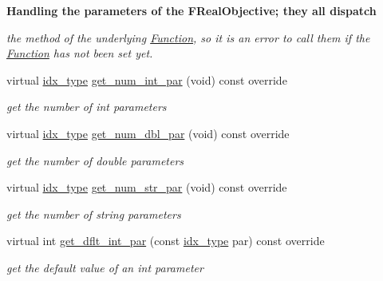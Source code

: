 \begin{Indent}\textbf{ Handling the parameters of the F\+Real\+Objective; they all dispatch}\par
{\em the method of the underlying \mbox{\hyperlink{class_s_m_spp__di__unipi__it_1_1_function}{Function}}, so it is an error to call them if the \mbox{\hyperlink{class_s_m_spp__di__unipi__it_1_1_function}{Function}} has not been set yet. }\begin{DoxyCompactItemize}
\item 
virtual \mbox{\hyperlink{class_s_m_spp__di__unipi__it_1_1_thin_compute_interface_aa3d710629ad8c434286726ad810c3b47}{idx\+\_\+type}} \mbox{\hyperlink{class_s_m_spp__di__unipi__it_1_1_f_real_objective_a3ad74d9506761eb2ca4c8a936fb7a1c5}{get\+\_\+num\+\_\+int\+\_\+par}} (void) const override
\begin{DoxyCompactList}\small\item\em get the number of int parameters \end{DoxyCompactList}\item 
virtual \mbox{\hyperlink{class_s_m_spp__di__unipi__it_1_1_thin_compute_interface_aa3d710629ad8c434286726ad810c3b47}{idx\+\_\+type}} \mbox{\hyperlink{class_s_m_spp__di__unipi__it_1_1_f_real_objective_a842fd454acaded84baf6b77e0d61a950}{get\+\_\+num\+\_\+dbl\+\_\+par}} (void) const override
\begin{DoxyCompactList}\small\item\em get the number of double parameters \end{DoxyCompactList}\item 
virtual \mbox{\hyperlink{class_s_m_spp__di__unipi__it_1_1_thin_compute_interface_aa3d710629ad8c434286726ad810c3b47}{idx\+\_\+type}} \mbox{\hyperlink{class_s_m_spp__di__unipi__it_1_1_f_real_objective_a91f0341f09d59b3023fc95122a625125}{get\+\_\+num\+\_\+str\+\_\+par}} (void) const override
\begin{DoxyCompactList}\small\item\em get the number of string parameters \end{DoxyCompactList}\item 
virtual int \mbox{\hyperlink{class_s_m_spp__di__unipi__it_1_1_f_real_objective_a75dd1491b74c4b9476755e061dce3e04}{get\+\_\+dflt\+\_\+int\+\_\+par}} (const \mbox{\hyperlink{class_s_m_spp__di__unipi__it_1_1_thin_compute_interface_aa3d710629ad8c434286726ad810c3b47}{idx\+\_\+type}} par) const override
\begin{DoxyCompactList}\small\item\em get the default value of an int parameter \end{DoxyCompactList}\item 

\end{DoxyCompactItemize}
\end{Indent}
